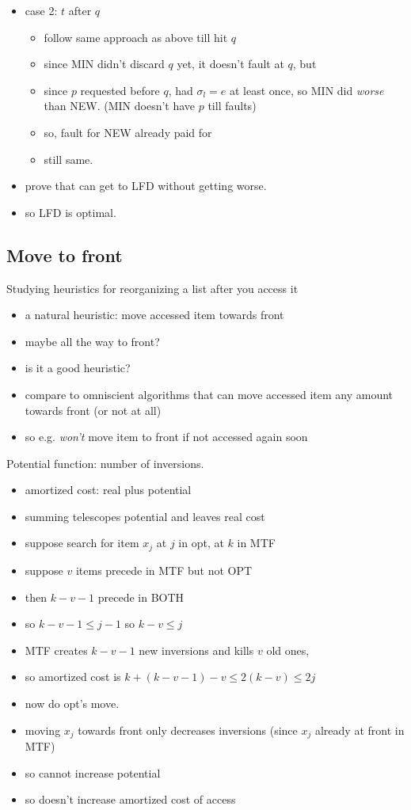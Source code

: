 \documentclass{article}
\begin{document}
\begin{itemize}
\item case 2: $t$ after $q$
\begin{itemize}
\item follow same approach as above till hit $q$
\item since MIN didn't discard $q$ yet, it doesn't fault at $q$, but
\item since $p$ requested before $q$, had $\sigma_l=e$ at least
  once, so MIN did \emph{worse} than NEW. (MIN doesn't have $p$ till
  faults)
\item so, fault for NEW already paid for
\item still same.
\end{itemize}
\item prove that can get to LFD without getting worse.
\item so LFD is optimal.
\end{itemize}


\subsection{Move to front}

Studying heuristics for reorganizing a list after you access it
\begin{itemize}
\item a natural heuristic: move accessed item towards front
\item maybe all the way to front?
\item is it a good heuristic?
\item compare to omniscient algorithms that can move accessed item
  any amount towards front (or not at all)
\item so e.g. \emph{won't} move item to front if not accessed again soon
\end{itemize}

Potential function: number of inversions.
\begin{itemize}
\item amortized cost: real plus potential
\item summing telescopes potential and leaves real cost
\item suppose search for item $x_j$ at $j$ in opt, at $k$ in MTF
\item suppose $v$ items precede in MTF but not OPT
\item then $k-v-1$ precede in BOTH
\item so $k-v-1 \le j-1$ so $k-v \le j$
\item MTF creates $k-v-1$ new inversions and kills $v$ old ones,
\item so amortized cost is $k+(k-v-1)-v \le 2(k-v)\le 2j$
\item now do opt's move.  
\item moving $x_j$ towards front only decreases
  inversions (since $x_j$ already at front in MTF)
\item so cannot increase potential
\item so doesn't increase amortized cost of access
\end{itemize}
\end{document}
